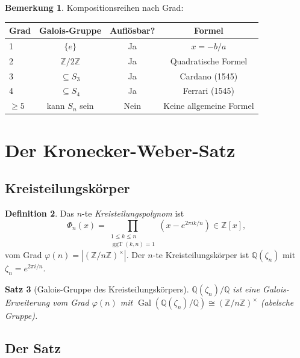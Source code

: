 \documentclass[12pt,a4paper]{amsart}
\newtheorem{theorem}{Satz}[section]
\theoremstyle{definition}
\newtheorem{definition}[theorem]{Definition}
\newtheorem{bemerkung}[theorem]{Bemerkung}
\newcommand{\Q}{\mathbb{Q}}
\newcommand{\Z}{\mathbb{Z}}
\newcommand{\Gal}{\operatorname{Gal}}
\newcommand{\ggT}{\operatorname{ggT}}
\begin{document}
\begin{bemerkung}
Kompositionsreihen nach Grad:
\begin{center}
\begin{tabular}{lccc}
\toprule
Grad & Galois-Gruppe & Auflösbar? & Formel \\
\midrule
1 & $\{e\}$ & Ja & $x = -b/a$ \\
2 & $\Z/2\Z$ & Ja & Quadratische Formel \\
3 & $\subseteq S_3$ & Ja & Cardano (1545) \\
4 & $\subseteq S_4$ & Ja & Ferrari (1545) \\
$\geq 5$ & kann $S_n$ sein & Nein & Keine allgemeine Formel \\
\bottomrule
\end{tabular}
\end{center}
\end{bemerkung}

\section{Der Kronecker-Weber-Satz}

\subsection{Kreisteilungskörper}

\begin{definition}
Das $n$-te \emph{Kreisteilungspolynom} ist
\[
  \Phi_n(x) = \prod_{\substack{1 \leq k \leq n \\ \ggT(k,n) = 1}} (x - e^{2\pi i k/n})
  \in \Z[x],
\]
vom Grad $\varphi(n) = |(\Z/n\Z)^\times|$. Der $n$-te Kreisteilungskörper ist
$\Q(\zeta_n)$ mit $\zeta_n = e^{2\pi i/n}$.
\end{definition}

\begin{theorem}[Galois-Gruppe des Kreisteilungskörpers]
$\Q(\zeta_n)/\Q$ ist eine Galois-Erweiterung vom Grad $\varphi(n)$ mit
$\Gal(\Q(\zeta_n)/\Q) \cong (\Z/n\Z)^\times$
(abelsche Gruppe).
\end{theorem}

\subsection{Der Satz}
\end{document}
